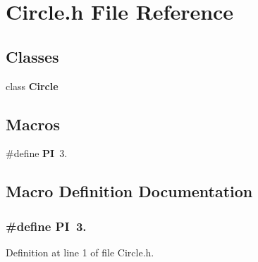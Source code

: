 \section{Circle.\-h File Reference}
\label{_circle_8h}
\subsection*{Classes}
\begin{DoxyCompactItemize}
\item 
class {\bf Circle}
\end{DoxyCompactItemize}
\subsection*{Macros}
\begin{DoxyCompactItemize}
\item 
\#define {\bf P\-I}~3.
\end{DoxyCompactItemize}


\subsection{Macro Definition Documentation}
\subsubsection[{P\-I}]{\setlength{\rightskip}{0pt plus 5cm}\#define P\-I~3.}\label{_circle_8h_a598a3330b3c21701223ee0ca14316eca}


Definition at line 1 of file Circle.\-h.


